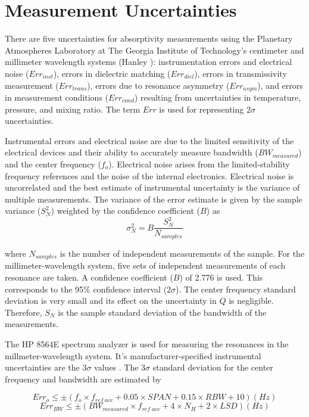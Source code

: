 \section{Measurement Uncertainties}

There are five uncertainties for absorptivity measurements using the Planetary Atmospheres Laboratory at The Georgia Institute of Technology's centimeter and millimeter wavelength systems (Hanley \cite{Hanley-thesis}): instrumentation errors and electrical noise ($Err_{inst}$), errors in dielectric matching ($Err_{diel}$), errors in transmissivity measurement ($Err_{trans}$), errors due to resonance asymmetry ($Err_{asym}$), and errors in measurement conditions ($Err_{cond}$) resulting from uncertainties in temperature, pressure, and mixing ratio. The term $Err$ is used for representing $2\sigma$ uncertainties.

Instrumental errors and electrical noise are due to the limited sensitivity of the electrical devices and their ability to accurately measure bandwidth ($BW_{measured}$) and the center frequency ($f_o$). Electrical noise arises from the limited-stability frequency references and the noise of the internal electronics. Electrical noise is uncorrelated and the best estimate of instrumental uncertainty is the variance of multiple measurements. The variance of the error estimate is given by the sample variance ($S^2_N$) weighted by the confidence coefficient ($B$) as
\begin{equation}\label{eq:sigman}
\sigma^2_N = B \frac{S^2_N}{N_{samples}}
\end{equation}

\noindent where $N_{samples}$ is the number of independent measurements of the sample. For the millimeter-wavelength system, five sets of independent measurements of each resonance are taken. A confidence coefficient ($B$) of 2.776 is used. This corresponds to the 95\% confidence interval ($2\sigma$). The center frequency standard deviation is very small and its effect on the uncertainty in $Q$ is negligible. Therefore, $S_N$ is the sample standard deviation of the bandwidth of the measurements.

The HP 8564E spectrum analyzer is used for measuring the resonances in the millmeter-wavelength system. It's manufacturer-specified instrumental uncertainties are the $3\sigma$ values \cite{Hewlett-Packard}. The $3\sigma$ standard deviation for the center frequency and bandwidth are estimated by 

\begin{equation}\label{eq:sigmao}
Err_o \leq \pm (f_o \times f_{ref\:acc} + 0.05 \times SPAN + 0.15 \times RBW +10 ) (Hz)
\end{equation}
\begin{equation}\label{eq:sigmabw}
Err_{BW} \leq \pm (BW_{measured} \times f_{ref\;acc} + 4 \times N_H +2 \times LSD ) (Hz)
\end{equation}

